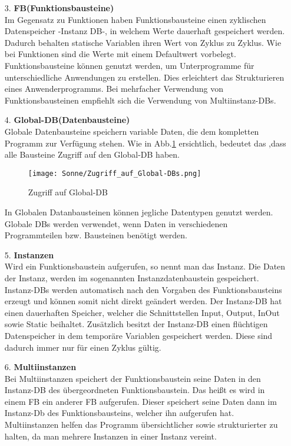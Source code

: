 \begin{itemize}
        \item[3.] \textbf{FB(Funktionsbausteine)} \\
            Im Gegensatz zu Funktionen haben Funktionsbausteine einen zyklischen Datenspeicher -Instanz DB-, in welchem Werte dauerhaft gespeichert werden. Dadurch behalten statische Variablen ihren Wert von Zyklus zu Zyklus. Wie bei Funktionen sind die Werte mit einem Defaultwert vorbelegt.\\
            Funktionsbausteine können genutzt werden, um Unterprogramme für unterschiedliche Anwendungen zu erstellen. Dies erleichtert das Strukturieren eines Anwenderprogramms. Bei mehrfacher Verwendung von Funktionsbausteinen empfiehlt sich die Verwendung von Multiinstanz-DBs.
        
        \item[4.] \textbf{Global-DB(Datenbausteine)} \\
            Globale Datenbausteine speichern variable Daten, die dem kompletten Programm zur Verfügung stehen. Wie in Abb.\ref{Zugriff auf Global-DB} ersichtlich, bedeutet das ,dass alle Bausteine Zugriff auf den Global-DB haben.

            \begin{figure}[h]
                \centering
                \texttt{[image: Sonne/Zugriff\_auf\_Global-DBs.png]}
                \caption{Zugriff auf Global-DB \cite{Programmierleitfaden_für_S7-1500}}
                \label{Zugriff auf Global-DB}
            \end{figure}

            In Globalen Datanbausteinen können jegliche Datentypen genutzt werden.\\
            Globale DBs werden verwendet, wenn Daten in verschiedenen Programmteilen bzw. Bausteinen benötigt werden.

        \item[5.] \textbf{Instanzen} \\
            Wird ein Funktionsbaustein aufgerufen, so nennt man das Instanz. Die Daten der Instanz, werden im sogenannten Instanzdatenbaustein gespeichert. Instanz-DBs werden automatisch nach den Vorgaben des Funktionsbausteins erzeugt und können somit nicht direkt geändert werden. Der Instanz-DB hat einen dauerhaften Speicher, welcher die Schnittstellen Input, Output, InOut sowie Static beihaltet. Zusätzlich besitzt der Instanz-DB einen flüchtigen Datenspeicher in dem temporäre Variablen gespeichert werden. Diese sind dadurch immer nur für einen Zyklus gültig.
            
        \item[6.] \textbf{Multiinstanzen} \\
            Bei Multiinstanzen speichert der Funktionsbaustein seine Daten in den Instanz-DB des übergeordneten Funktionsbaustein. Das heißt es wird in einem FB ein anderer FB aufgerufen. Dieser speichert seine Daten dann im Instanz-Db des Funktionsbausteins, welcher ihn aufgerufen hat. Multiinstanzen helfen das Programm übersichtlicher sowie strukturierter zu halten, da man mehrere Instanzen in einer Instanz vereint.

    \end{itemize}

